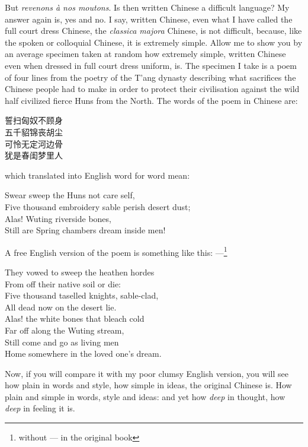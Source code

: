 But \emph{revenons \`a nos moutons}.  
Is then written Chinese a difficult language?
My answer again is, yes and no.
I say, written Chinese, even what I have called the full court dress Chinese, the \emph{classica majora} Chinese, is not difficult, because, like the spoken or colloquial Chinese, it is extremely simple.
Allow me to show you by an average specimen taken at random how extremely simple, written Chinese even when dressed in full court dress uniform, is.
The specimen I take is a poem of four lines from the poetry of the T'ang dynasty  describing what sacrifices the Chinese people had to make in order to protect their civilisation against the wild half civilized fierce Huns  from the North.
The words of the poem in Chinese are:
\begin{center}
    誓扫匈奴不顾身 \\
    五千貂锦丧胡尘 \\
    可怜无定河边骨 \\
    犹是春闺梦里人 \\
\end{center}
which translated into English word for word mean:
\begin{center}
    Swear sweep the Huns not care self, \\
    Five thousand embroidery sable perish desert dust; \\
    Alas! Wuting riverside bones, \\
    Still are Spring chambers dream inside men!
\end{center}
A free English version of the poem is something like this: ---\footnote{without --- in the original book}
\begin{center}
    They vowed to sweep the heathen hordes \\
    From off their native soil or die: \\
    Five thousand taselled knights, sable-clad, \\
    All dead now on the desert lie. \\
    Alas! the white bones that bleach cold \\
    Far off along the Wuting stream, \\
    Still come and go as living men \\
    Home somewhere in the loved one's dream.
\end{center}

Now, if you will compare it with my poor clumsy English version, you will see how plain in words and style, how simple in ideas, the original Chinese is.
How plain and simple in words, style and ideas: and yet how \emph{deep} in thought, how \emph{deep} in feeling it is.

